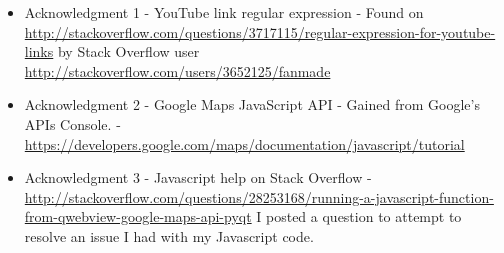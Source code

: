 \begin{itemize}
\item Acknowledgment 1 - YouTube link regular expression - Found on \url{http://stackoverflow.com/questions/3717115/regular-expression-for-youtube-links} by Stack Overflow user \url{http://stackoverflow.com/users/3652125/fanmade}
\item Acknowledgment 2 - Google Maps JavaScript API - Gained from Google's APIs Console. - \url{https://developers.google.com/maps/documentation/javascript/tutorial}
\item Acknowledgment 3 - Javascript help on Stack Overflow - \url{http://stackoverflow.com/questions/28253168/running-a-javascript-function-from-qwebview-google-maps-api-pyqt} I posted a question to attempt to resolve an issue I had with my Javascript code.
\end{itemize}

